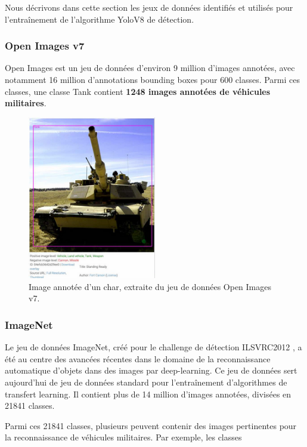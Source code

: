 Nous décrivons dans cette section les jeux de données identifiés et utilisés pour l’entraînement de l’algorithme YoloV8 de détection.

\subsubsection{Open Images v7}

Open Images \cite{openimages2024} est un jeu de données d’environ 9 million d’images annotées, avec notamment 16 million d’annotations bounding boxes pour 600 classes.
Parmi ces classes, une classe Tank contient \textbf{1248 images annotées de véhicules militaires}.

\begin{figure}[H]
    \center
    \includegraphics[width=0.5\textwidth]{./images/char-leclerc-openv7.png}
    \caption[Image annotée d’un char]{Image annotée d’un char, extraite du jeu de données Open Images v7.}\label{fig:image-annotée-char}
\end{figure}

\subsubsection{ImageNet}

Le jeu de données ImageNet, créé pour le challenge de détection ILSVRC2012 \cite{imagenet2012}, a été au centre des avancées récentes dans le domaine de la reconnaissance automatique d’objets dans des images par deep-learning.
Ce jeu de données sert aujourd’hui de jeu de données standard pour l’entraînement d’algorithmes de transfert learning.
Il contient plus de 14 million d’images annotées, divisées en 21841 classes.

Parmi ces 21841 classes, plusieurs peuvent contenir des images pertinentes pour la reconnaissance de véhicules militaires. Par exemple, les classes

